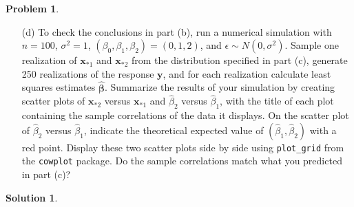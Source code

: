 \documentclass[11pt,letterpaper,english,oneside]{article} %
\theoremstyle{definition} %
\newtheorem{problem}{Problem}
\newtheorem{solution}{Solution}
\newenvironment{prob}{\clearpage \begin{problem}\hspace{0pt}}{\end{problem}}
\newenvironment{sol}{\begin{solution}\hspace{0pt}}{\end{solution}}
\begin{document}
\begin{prob}
\begin{enumerate}
\item[(d)] To check the conclusions in part (b), run a numerical simulation with $n = 100$, $\sigma^2 = 1$, $(\beta_0, \beta_1, \beta_2) = (0,1,2)$, and $\epsilon \sim N(0, \sigma^2)$. Sample one realization of $\bm x_{*1}$ and $\bm x_{*2}$ from the distribution specified in part (c), generate 250 realizations of the response $\bm y$, and for each realization calculate least squares estimates $\bm{\widehat \beta}$. Summarize the results of your simulation by creating scatter plots of $\bm x_{*2}$ versus $\bm x_{*1}$ and $\widehat \beta_{2}$ versus $\widehat \beta_{1}$, with the title of each plot containing the sample correlations of the data it displays. On the scatter plot of $\widehat \beta_{2}$ versus $\widehat \beta_{1}$, indicate the theoretical expected value of $(\widehat \beta_{1}, \widehat \beta_2)$ with a red point. Display these two scatter plots side by side using \texttt{plot\_grid} from the \verb|cowplot| package. Do the sample correlations match what you predicted in part (c)?
\end{enumerate}

\end{prob}
\begin{sol}
\end{sol}
\end{document}
